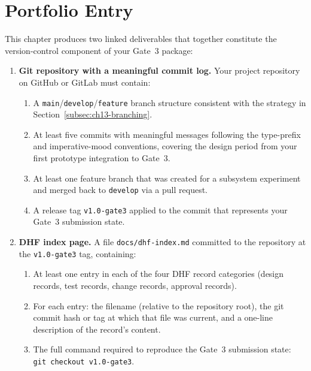 \section*{Portfolio Entry}
\label{sec:ch13-artifact}

This chapter produces two linked deliverables that together constitute the version-control
component of your Gate~3 package:

\begin{enumerate}
  \item \textbf{Git repository with a meaningful commit log.}
        Your project repository on GitHub or GitLab must contain:
        \begin{enumerate}
          \item[(a)] A \texttt{main}/\texttt{develop}/\texttt{feature} branch structure
                     consistent with the strategy in Section~\ref{subsec:ch13-branching}.
          \item[(b)] At least five commits with meaningful messages following the
                     type-prefix and imperative-mood conventions, covering the design
                     period from your first prototype integration to Gate~3.
          \item[(c)] At least one feature branch that was created for a subsystem
                     experiment and merged back to \texttt{develop} via a pull request.
          \item[(d)] A release tag \texttt{v1.0-gate3} applied to the commit that
                     represents your Gate~3 submission state.
        \end{enumerate}

  \item \textbf{DHF index page.}
        A file \texttt{docs/dhf-index.md} committed to the repository at the
        \texttt{v1.0-gate3} tag, containing:
        \begin{enumerate}
          \item[(a)] At least one entry in each of the four DHF record categories
                     (design records, test records, change records, approval records).
          \item[(b)] For each entry: the filename (relative to the repository root),
                     the git commit hash or tag at which that file was current, and a
                     one-line description of the record's content.
          \item[(c)] The full command required to reproduce the Gate~3 submission state:
                     \texttt{git checkout v1.0-gate3}.
        \end{enumerate}
\end{enumerate}

